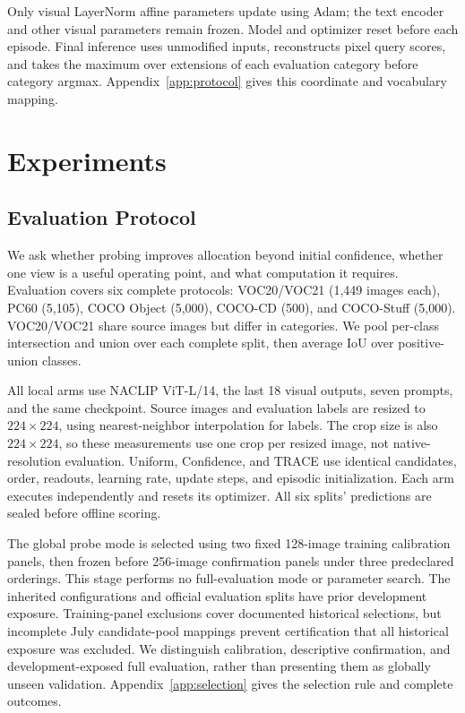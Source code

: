 \documentclass[letterpaper]{article}
\begin{document}
Only visual LayerNorm affine parameters update using Adam; the text encoder and other visual parameters remain frozen. Model and optimizer reset before each episode. Final inference uses unmodified inputs, reconstructs pixel query scores, and takes the maximum over extensions of each evaluation category before category argmax. Appendix~\ref{app:protocol} gives this coordinate and vocabulary mapping.

\section{Experiments}
\subsection{Evaluation Protocol}
We ask whether probing improves allocation beyond initial confidence, whether one view is a useful operating point, and what computation it requires. Evaluation covers six complete protocols: VOC20/VOC21 (1,449 images each), PC60 (5,105), COCO Object (5,000), COCO-CD (500), and COCO-Stuff (5,000). VOC20/VOC21 share source images but differ in categories. We pool per-class intersection and union over each complete split, then average IoU over positive-union classes.

All local arms use NACLIP ViT-L/14, the last 18 visual outputs, seven prompts, and the same checkpoint. Source images and evaluation labels are resized to $224\times224$, using nearest-neighbor interpolation for labels. The crop size is also $224\times224$, so these measurements use one crop per resized image, not native-resolution evaluation. Uniform, Confidence, and TRACE use identical candidates, order, readouts, learning rate, update steps, and episodic initialization. Each arm executes independently and resets its optimizer. All six splits' predictions are sealed before offline scoring.

The global probe mode is selected using two fixed 128-image training calibration panels, then frozen before 256-image confirmation panels under three predeclared orderings. This stage performs no full-evaluation mode or parameter search. The inherited configurations and official evaluation splits have prior development exposure. Training-panel exclusions cover documented historical selections, but incomplete July candidate-pool mappings prevent certification that all historical exposure was excluded. We distinguish calibration, descriptive confirmation, and development-exposed full evaluation, rather than presenting them as globally unseen validation. Appendix~\ref{app:selection} gives the selection rule and complete outcomes.
\end{document}
